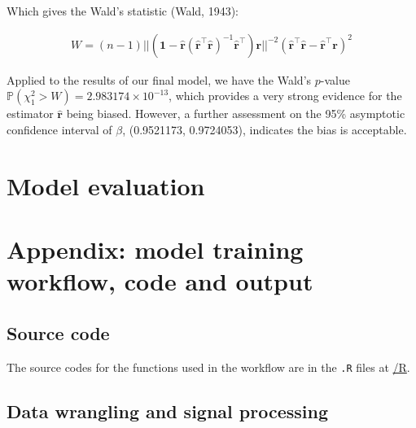 \documentclass[
]{article}
\begin{document}
Which gives the Wald's statistic (Wald, 1943):

\begin{align*}
  W = (n - 1) ||(\mathbf{1} - \mathbf{\hat{r}}(\mathbf{\hat{r}}^\top\mathbf{\hat{r}})^{-1}\mathbf{\hat{r}}^\top)\mathbf{r}||^{-2}(\mathbf{\hat{r}}^\top\mathbf{\hat{r}} - \mathbf{\hat{r}}^\top\mathbf{r})^2
\end{align*}

Applied to the results of our final model, we have the Wald's
\(p\)-value \(\mathbb{P}(\chi_1^2 > W) = 2.983174 \times 10^{-13}\),
which provides a very strong evidence for the estimator
\(\mathbf{\hat{r}}\) being biased. However, a further assessment on the
95\% asymptotic confidence interval of \(\beta\), (0.9521173,
0.9724053), indicates the bias is acceptable.

\hypertarget{model-evaluation}{%
\section{Model evaluation}\label{model-evaluation}}

\newpage

\hypertarget{appendix-model-training-workflow-code-and-output}{%
\section{Appendix: model training workflow, code and
output}\label{appendix-model-training-workflow-code-and-output}}

\hypertarget{source-code}{%
\subsection{Source code}\label{source-code}}

The source codes for the functions used in the workflow are in the
\texttt{.R} files at
\href{https://github.com/szmsu2011/comp90072/blob/main/R}{/R}.

\hypertarget{data-wrangling-and-signal-processing}{%
\subsection{Data wrangling and signal
processing}\label{data-wrangling-and-signal-processing}}
\end{document}

